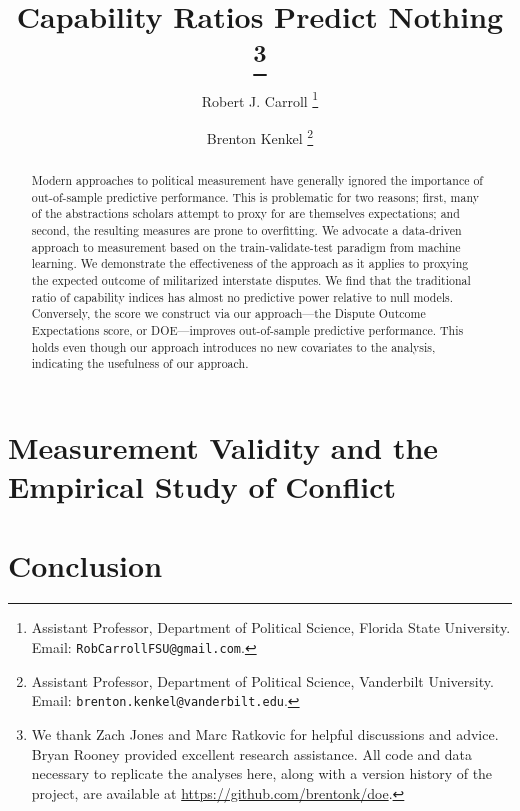 \documentclass[11pt,oneside]{article}
\title{
  Capability Ratios Predict Nothing%
  \thanks{%
    We thank Zach Jones and Marc Ratkovic for helpful discussions and advice.
    Bryan Rooney provided excellent research assistance.
    All code and data necessary to replicate the analyses here, along with a version history of the project, are available at \url{https://github.com/brentonk/doe}.
  }%
}
\author{%
  Robert J. Carroll%
  \thanks{%
    Assistant Professor, Department of Political Science, Florida State University.  Email:  \nolinkurl{RobCarrollFSU@gmail.com}.
  }%
  \and%
  Brenton Kenkel%
  \thanks{
    Assistant Professor, Department of Political Science, Vanderbilt University.
    Email: \nolinkurl{brenton.kenkel@vanderbilt.edu}.
  }%
}
\begin{document}
\maketitle

\begin{abstract}
  Modern approaches to political measurement have generally ignored the importance of out-of-sample predictive performance. 
  This is problematic for two reasons; first, many of the abstractions scholars attempt to proxy for are themselves expectations; and second, the resulting measures are prone to overfitting. 
  We advocate a data-driven approach to measurement based on the train-validate-test paradigm from machine learning. 
  We demonstrate the effectiveness of the approach as it applies to proxying the expected outcome of militarized interstate disputes. 
  We find that the traditional ratio of capability indices has almost no predictive power relative to null models. 
  Conversely, the score we construct via our approach---the Dispute Outcome Expectations score, or DOE---improves out-of-sample predictive performance. 
  This holds even though our approach introduces no new covariates to the analysis, indicating the usefulness of our approach.
\end{abstract}

\clearpage














\section{Measurement Validity and the Empirical Study of Conflict}


\section{Conclusion}


\clearpage
\appendix


\newpage


\end{document}
